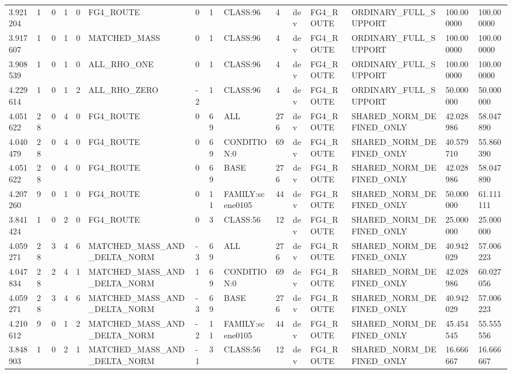 \begin{tabular}{lllllllllllllll}
3.921204 & 1 & 0 & 1 & 0 & FG4\_ROUTE & 0 & 1 & CLASS:96 & 4 & dev & FG4\_ROUTE & ORDINARY\_FULL\_SUPPORT & 100.000000 & 100.000000 \\
3.917607 & 1 & 0 & 1 & 0 & MATCHED\_MASS & 0 & 1 & CLASS:96 & 4 & dev & FG4\_ROUTE & ORDINARY\_FULL\_SUPPORT & 100.000000 & 100.000000 \\
3.908539 & 1 & 0 & 1 & 0 & ALL\_RHO\_ONE & 0 & 1 & CLASS:96 & 4 & dev & FG4\_ROUTE & ORDINARY\_FULL\_SUPPORT & 100.000000 & 100.000000 \\
4.229614 & 1 & 0 & 1 & 2 & ALL\_RHO\_ZERO & -2 & 1 & CLASS:96 & 4 & dev & FG4\_ROUTE & ORDINARY\_FULL\_SUPPORT & 50.000000 & 50.000000 \\
4.051622 & 28 & 0 & 4 & 0 & FG4\_ROUTE & 0 & 69 & ALL & 276 & dev & FG4\_ROUTE & SHARED\_NORM\_DEFINED\_ONLY & 42.028986 & 58.047890 \\
4.040479 & 28 & 0 & 4 & 0 & FG4\_ROUTE & 0 & 69 & CONDITION:0 & 69 & dev & FG4\_ROUTE & SHARED\_NORM\_DEFINED\_ONLY & 40.579710 & 55.860390 \\
4.051622 & 28 & 0 & 4 & 0 & FG4\_ROUTE & 0 & 69 & BASE & 276 & dev & FG4\_ROUTE & SHARED\_NORM\_DEFINED\_ONLY & 42.028986 & 58.047890 \\
4.207260 & 9 & 0 & 1 & 0 & FG4\_ROUTE & 0 & 11 & FAMILY:scene0105 & 44 & dev & FG4\_ROUTE & SHARED\_NORM\_DEFINED\_ONLY & 50.000000 & 61.111111 \\
3.841424 & 1 & 0 & 2 & 0 & FG4\_ROUTE & 0 & 3 & CLASS:56 & 12 & dev & FG4\_ROUTE & SHARED\_NORM\_DEFINED\_ONLY & 25.000000 & 25.000000 \\
4.059271 & 28 & 3 & 4 & 6 & MATCHED\_MASS\_AND\_DELTA\_NORM & -3 & 69 & ALL & 276 & dev & FG4\_ROUTE & SHARED\_NORM\_DEFINED\_ONLY & 40.942029 & 57.006223 \\
4.047834 & 28 & 2 & 4 & 1 & MATCHED\_MASS\_AND\_DELTA\_NORM & 1 & 69 & CONDITION:0 & 69 & dev & FG4\_ROUTE & SHARED\_NORM\_DEFINED\_ONLY & 42.028986 & 60.027056 \\
4.059271 & 28 & 3 & 4 & 6 & MATCHED\_MASS\_AND\_DELTA\_NORM & -3 & 69 & BASE & 276 & dev & FG4\_ROUTE & SHARED\_NORM\_DEFINED\_ONLY & 40.942029 & 57.006223 \\
4.210612 & 9 & 0 & 1 & 2 & MATCHED\_MASS\_AND\_DELTA\_NORM & -2 & 11 & FAMILY:scene0105 & 44 & dev & FG4\_ROUTE & SHARED\_NORM\_DEFINED\_ONLY & 45.454545 & 55.555556 \\
3.848903 & 1 & 0 & 2 & 1 & MATCHED\_MASS\_AND\_DELTA\_NORM & -1 & 3 & CLASS:56 & 12 & dev & FG4\_ROUTE & SHARED\_NORM\_DEFINED\_ONLY & 16.666667 & 16.666667 \\

\end{tabular}
